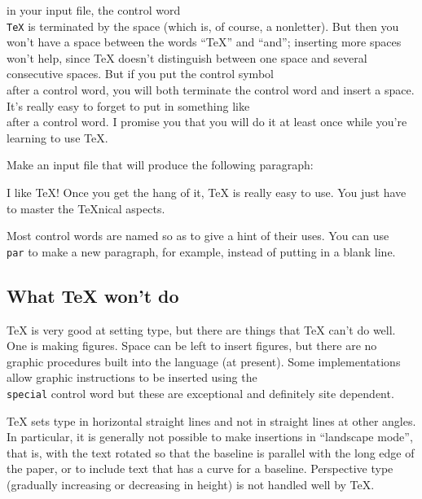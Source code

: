  
\noindent 
in your input file, the control word {\tt\\TeX} is terminated by 
the space (which is, of course, a nonletter). But then you won't 
have a space between the words ``\TeX{}'' and ``and''; inserting 
more spaces won't help, since \TeX{} doesn't distinguish between 
one space and several consecutive spaces. But if you put the 
control symbol {\tt\\\sp} after a control word, you will both 
terminate the control word and insert a space. It's really easy 
to forget to put in something like {\tt\\\sp} after a control 
word. I promise you that you will do it at least once while 
you're learning to use \TeX\null. 
 
\exercise Make an input file that will produce the following 
paragraph: 
 
I like \TeX! Once you get the hang of it, \TeX{} is really easy 
to use. You just have to master the \TeX nical aspects. 
 
Most control words are named so as to give a hint of their uses. 
You can use {\tt \\par} to make a new paragraph, for example, 
instead of putting in a blank line. 
 
\subsection{What \TeX{} won't do} 
 
\TeX{} is very good at setting type, but there are things that \TeX{} 
can't do well.  One is making figures.  Space can be left 
to insert figures, but there are no graphic procedures built into 
the language (at present).  Some implementations allow graphic 
instructions to be inserted using the {\tt \\special} control 
word but these are exceptional and definitely site dependent. 
 
\TeX{} sets type in horizontal straight lines and not in 
straight lines at other angles. In particular, it is generally 
not possible to make insertions in ``landscape mode'', that is, 
with the text rotated so that the baseline is parallel with 
the long edge of the paper, or to include text that has a curve for 
a baseline. Perspective type (gradually increasing or 
decreasing in height) is not handled well by \TeX\null. 
 
